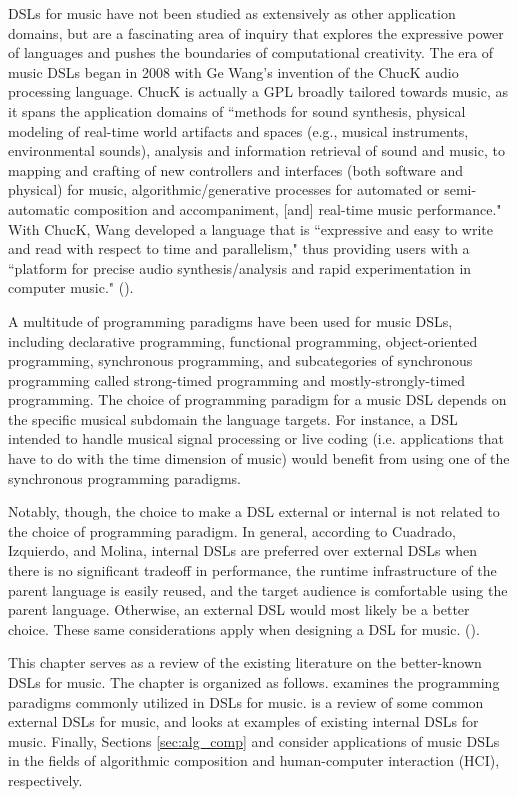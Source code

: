 \documentclass{report}
\newcommand\citeparen[1]{(\cite{#1})}
\begin{document}
DSLs for music have not been studied as extensively as other application domains, but are a fascinating area of inquiry that explores the expressive power of languages and pushes the boundaries of computational creativity. The era of music DSLs began in 2008  with Ge Wang's invention of the ChucK audio processing language. ChucK is actually a GPL broadly tailored towards music, as it spans the application domains of ``methods for sound synthesis, physical modeling of real-time world artifacts and spaces (e.g.,
musical instruments, environmental sounds), analysis and information retrieval of sound and music, to mapping and crafting of new controllers and interfaces (both software and physical) for music, algorithmic/generative processes for automated or semi-automatic composition and accompaniment, [and] real-time music performance." With ChucK, Wang developed a language that is ``expressive and easy to write and read with respect to time and parallelism," thus providing users with a ``platform for precise audio synthesis/analysis and rapid experimentation in computer music." \citeparen{wang_2008}. 

A multitude of programming paradigms have been used for music DSLs, including declarative programming, functional programming, object-oriented programming, synchronous programming, and subcategories of synchronous programming called strong-timed programming and mostly-strongly-timed programming. The choice of programming paradigm for a music DSL depends on the specific musical subdomain the language targets. For instance, a DSL intended to handle musical signal processing or live coding (i.e. applications that have to do with the time dimension of music) would benefit from using one of the synchronous programming paradigms. 

Notably, though, the choice to make a DSL external or internal is not related to the choice of programming paradigm. In general, according to Cuadrado, Izquierdo, and Molina, internal DSLs are preferred over external DSLs when there  is  no significant tradeoff in performance, the runtime infrastructure of the parent language is easily reused, and the target audience is comfortable using  the parent language. Otherwise, an external DSL would most likely be a better choice. These same considerations apply when designing a DSL for music.
\citeparen{cuadrado_izquierdo_molina_2012}.

This chapter serves as a review of the existing literature on the better-known DSLs for music. The chapter is organized as follows.  examines the programming paradigms commonly utilized in  DSLs for music.  is a review of some common external DSLs for music, and  looks at examples of existing internal  DSLs for music. Finally, Sections \ref{sec:alg_comp} and  consider applications of  music DSLs in the fields of algorithmic composition and human-computer  interaction (HCI), respectively.
\end{document}
